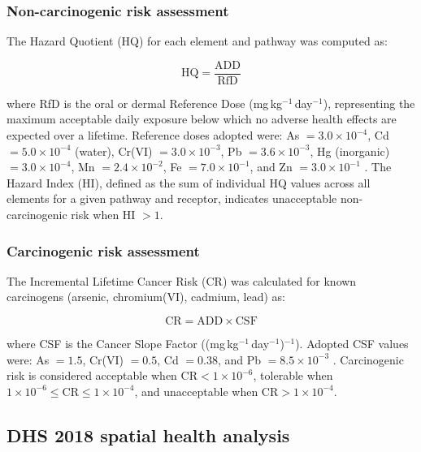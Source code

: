 \documentclass[preprint,12pt,authoryear]{elsarticle}
\begin{document}
\subsubsection{Non-carcinogenic risk assessment}

The Hazard Quotient (HQ) for each element and pathway was computed as:

\begin{equation}
\text{HQ} = \frac{\text{ADD}}{\text{RfD}}
\label{eq:hq}
\end{equation}

\noindent where RfD is the oral or dermal Reference Dose (mg\,kg$^{-1}$\,day$^{-1}$), representing the maximum acceptable daily exposure below which no adverse health effects are expected over a lifetime. Reference doses adopted were: As $= 3.0 \times 10^{-4}$, Cd $= 5.0 \times 10^{-4}$ (water), Cr(VI) $= 3.0 \times 10^{-3}$, Pb $= 3.6 \times 10^{-3}$, Hg (inorganic) $= 3.0 \times 10^{-4}$, Mn $= 2.4 \times 10^{-2}$, Fe $= 7.0 \times 10^{-1}$, and Zn $= 3.0 \times 10^{-1}$ \citep{USEPA2011}. The Hazard Index (HI), defined as the sum of individual HQ values across all elements for a given pathway and receptor, indicates unacceptable non-carcinogenic risk when HI $> 1$.

\subsubsection{Carcinogenic risk assessment}

The Incremental Lifetime Cancer Risk (CR) was calculated for known carcinogens (arsenic, chromium(VI), cadmium, lead) as:

\begin{equation}
\text{CR} = \text{ADD} \times \text{CSF}
\label{eq:cr}
\end{equation}

\noindent where CSF is the Cancer Slope Factor ((mg\,kg$^{-1}$\,day$^{-1}$)$^{-1}$). Adopted CSF values were: As $= 1.5$, Cr(VI) $= 0.5$, Cd $= 0.38$, and Pb $= 8.5 \times 10^{-3}$ \citep{USEPA2011}. Carcinogenic risk is considered acceptable when $\text{CR} < 1 \times 10^{-6}$, tolerable when $1 \times 10^{-6} \leq \text{CR} \leq 1 \times 10^{-4}$, and unacceptable when $\text{CR} > 1 \times 10^{-4}$.


\subsection{DHS 2018 spatial health analysis}
\end{document}
